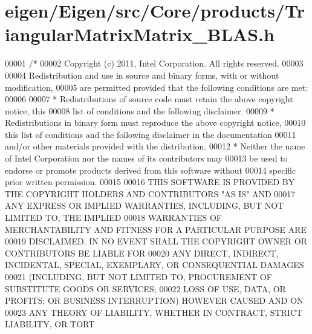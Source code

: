 \hypertarget{eigen_2_eigen_2src_2_core_2products_2_triangular_matrix_matrix___b_l_a_s_8h_source}{}\section{eigen/\+Eigen/src/\+Core/products/\+Triangular\+Matrix\+Matrix\+\_\+\+B\+L\+AS.h}
\label{eigen_2_eigen_2src_2_core_2products_2_triangular_matrix_matrix___b_l_a_s_8h_source}

\begin{DoxyCode}
00001 \textcolor{comment}{/*}
00002 \textcolor{comment}{ Copyright (c) 2011, Intel Corporation. All rights reserved.}
00003 \textcolor{comment}{}
00004 \textcolor{comment}{ Redistribution and use in source and binary forms, with or without modification,}
00005 \textcolor{comment}{ are permitted provided that the following conditions are met:}
00006 \textcolor{comment}{}
00007 \textcolor{comment}{ * Redistributions of source code must retain the above copyright notice, this}
00008 \textcolor{comment}{   list of conditions and the following disclaimer.}
00009 \textcolor{comment}{ * Redistributions in binary form must reproduce the above copyright notice,}
00010 \textcolor{comment}{   this list of conditions and the following disclaimer in the documentation}
00011 \textcolor{comment}{   and/or other materials provided with the distribution.}
00012 \textcolor{comment}{ * Neither the name of Intel Corporation nor the names of its contributors may}
00013 \textcolor{comment}{   be used to endorse or promote products derived from this software without}
00014 \textcolor{comment}{   specific prior written permission.}
00015 \textcolor{comment}{}
00016 \textcolor{comment}{ THIS SOFTWARE IS PROVIDED BY THE COPYRIGHT HOLDERS AND CONTRIBUTORS "AS IS" AND}
00017 \textcolor{comment}{ ANY EXPRESS OR IMPLIED WARRANTIES, INCLUDING, BUT NOT LIMITED TO, THE IMPLIED}
00018 \textcolor{comment}{ WARRANTIES OF MERCHANTABILITY AND FITNESS FOR A PARTICULAR PURPOSE ARE}
00019 \textcolor{comment}{ DISCLAIMED. IN NO EVENT SHALL THE COPYRIGHT OWNER OR CONTRIBUTORS BE LIABLE FOR}
00020 \textcolor{comment}{ ANY DIRECT, INDIRECT, INCIDENTAL, SPECIAL, EXEMPLARY, OR CONSEQUENTIAL DAMAGES}
00021 \textcolor{comment}{ (INCLUDING, BUT NOT LIMITED TO, PROCUREMENT OF SUBSTITUTE GOODS OR SERVICES;}
00022 \textcolor{comment}{ LOSS OF USE, DATA, OR PROFITS; OR BUSINESS INTERRUPTION) HOWEVER CAUSED AND ON}
00023 \textcolor{comment}{ ANY THEORY OF LIABILITY, WHETHER IN CONTRACT, STRICT LIABILITY, OR TORT}

\end{DoxyCode}
